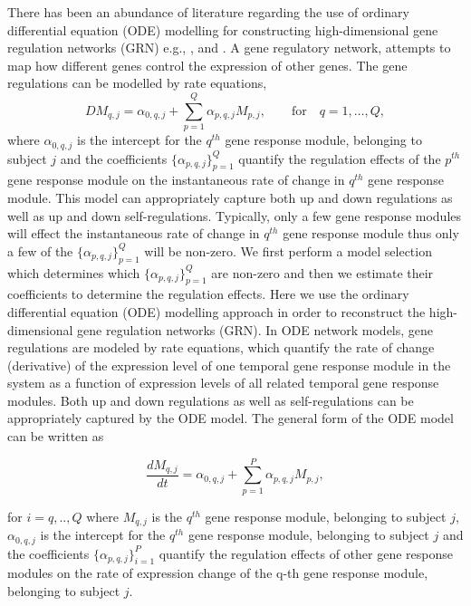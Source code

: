 There has been an abundance of literature regarding the use of ordinary differential equation (ODE) modelling for constructing high-dimensional gene regulation networks (GRN) e.g., \cite{hecker2009gene}, \cite{lu2011high} and \cite{wu2013high}. A gene regulatory network, attempts to map how different genes control the expression of other genes. The gene regulations can be modelled by rate equations, $$ D M_{q,j} = \alpha_{0,q,j} + \sum_{p=1}^{Q} \alpha_{p,q,j}M_{p,j}, \qquad \textrm{for} \quad q =1,\ldots,Q, $$ where $\alpha_{0,q,j}$ is the intercept for the $q^{th}$ gene response module, belonging to subject $j$ and the coefficients $\{\alpha_{p,q,j}\}_{p=1}^{Q}$ quantify the regulation effects of the $p^{th}$ gene response module on the instantaneous rate of change in $q^{th}$ gene response module. This model can appropriately capture both up and down regulations as well as up and down self-regulations. Typically, only a few gene response modules will effect the instantaneous rate of change in $q^{th}$ gene response module thus only a few of the $\{\alpha_{p,q,j}\}_{p=1}^{Q}$ will be non-zero. We first perform a model selection which determines which $\{\alpha_{p,q,j}\}_{p=1}^{Q}$ are non-zero and then we estimate their coefficients to determine the regulation effects. Here we use the ordinary differential equation (ODE) modelling approach in order to reconstruct the high-dimensional gene regulation networks (GRN). In ODE network models, gene regulations are modeled by rate equations, which quantify the rate of change (derivative) of the expression level of one temporal gene response module in the system as a function of expression levels of all related temporal gene response modules. Both up and down regulations as well as self-regulations can be appropriately captured by the ODE model. The general form of the ODE model can be written as

\begin{equation} \frac{dM_{q,j}}{dt} = \alpha_{0,q,j} + \sum_{p=1}^{P} \alpha_{p,q,j}M_{p,j}, \end{equation}

for $i =q,..,Q$ where $M_{q,j}$ is the $q^{th}$ gene response module, belonging to subject $j$, $\alpha_{0,q,j}$ is the intercept for the $q^{th}$ gene response module, belonging to subject $j$ and the coefficients $\{\alpha_{p,q,j}\}_{i=1}^{P}$ quantify the regulation effects of other gene response modules on the rate of expression change of the q-th gene response module, belonging to subject $j$.

